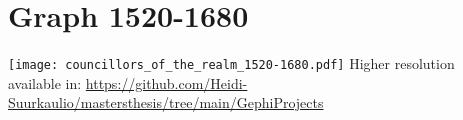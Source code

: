 \section{Graph 1520-1680}
\texttt{[image: councillors\_of\_the\_realm\_1520-1680.pdf]}
Higher resolution available in: \url{https://github.com/Heidi-Suurkaulio/mastersthesis/tree/main/GephiProjects}